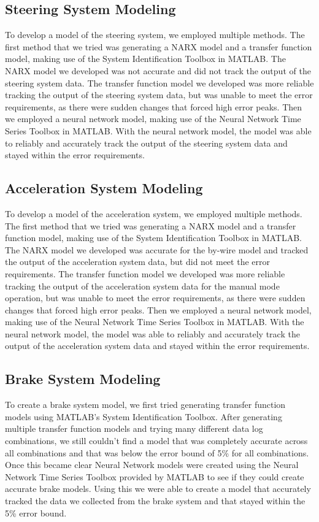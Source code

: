 \documentclass[conference]{IEEEtran}
\begin{document}
\subsection{Steering System Modeling}
To develop a model of the steering system, we employed multiple methods. The first method that we tried was generating a NARX model and a transfer function model, making use of the System Identification Toolbox in MATLAB. The NARX model we developed was not accurate and did not track the output of the steering system data. The transfer function model we developed was more reliable tracking the output of the steering system data, but was unable to meet the error requirements, as there were sudden changes that forced high error peaks. Then we employed a neural network model, making use of the Neural Network Time Series Toolbox in MATLAB. With the neural network model, the model was able to reliably and accurately track the output of the steering system data and stayed within the error requirements.

\subsection{Acceleration System Modeling}
To develop a model of the acceleration system, we employed multiple methods. The first method that we tried was generating a NARX model and a transfer function model, making use of the System Identification Toolbox in MATLAB. The NARX model we developed was accurate for the by-wire model and tracked the output of the acceleration system data, but did not meet the error requirements. The transfer function model we developed was more reliable tracking the output of the acceleration system data for the manual mode operation, but was unable to meet the error requirements, as there were sudden changes that forced high error peaks. Then we employed a neural network model, making use of the Neural Network Time Series Toolbox in MATLAB. With the neural network model, the model was able to reliably and accurately track the output of the acceleration system data and stayed within the error requirements.

\subsection{Brake System Modeling}
To create a brake system model, we first tried generating transfer function models using MATLAB’s System Identification Toolbox. After generating multiple transfer function models and trying many different data log combinations, we still couldn’t find a model that was completely accurate across all combinations and that was below the error bound of 5\% for all combinations. Once this became clear Neural Network models were created using the Neural Network Time Series Toolbox provided by MATLAB to see if they could create accurate brake models. Using this we were able to create a model that accurately tracked the data we collected from the brake system and that stayed within the 5\% error bound.
\end{document}
